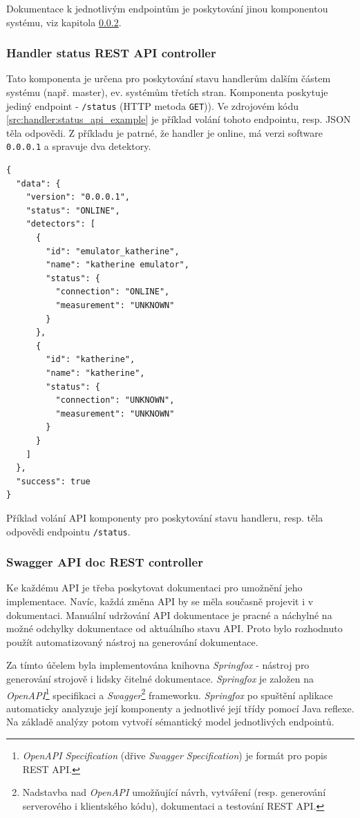 Dokumentace k jednotlivým endpointům je poskytování jinou komponentou systému, viz kapitola \ref{chap:handler:spring:swagger}.

\subsubsection{Handler status REST API controller}\label{chap:handler:spring:status_api}
Tato komponenta je určena pro poskytování stavu handlerům dalším částem systému (např. master), ev. systémům třetích stran. Komponenta poskytuje jediný endpoint - \texttt{/status} (HTTP metoda \texttt{GET})). Ve zdrojovém kódu \ref{src:handler:status_api_example} je příklad volání tohoto endpointu, resp. JSON těla odpovědi. Z příkladu je patrné, že handler je online, má verzi software \texttt{0.0.0.1} a spravuje dva detektory.

\begin{code}[h!]
  \begin{verbatim}
{
  "data": {
    "version": "0.0.0.1",
    "status": "ONLINE",
    "detectors": [
      {
        "id": "emulator_katherine",
        "name": "katherine emulator",
        "status": {
          "connection": "ONLINE",
          "measurement": "UNKNOWN"
        }
      },
      {
        "id": "katherine",
        "name": "katherine",
        "status": {
          "connection": "UNKNOWN",
          "measurement": "UNKNOWN"
        }
      }
    ]
  },
  "success": true
}
\end{verbatim}
\caption{Příklad volání API komponenty pro poskytování stavu handleru, resp. těla odpovědi endpointu \texttt{/status}.}
\label{src:handler:status_api_example}
\end{code}


\subsubsection{Swagger API doc REST controller}\label{chap:handler:spring:swagger}
Ke každému API je třeba poskytovat dokumentaci pro umožnění jeho implementace. Navíc, každá změna API by se měla současně projevit i v dokumentaci. Manuální udržování API dokumentace je pracné a náchylné na možné odchylky dokumentace od aktuálního stavu API. Proto bylo rozhodnuto použít automatizovaný nástroj na generování dokumentace.

Za tímto účelem byla implementována knihovna \textit{Springfox} \cite{springfox} - nástroj pro generování strojově i lidsky čitelné dokumentace. \textit{Springfox} je založen na \textit{OpenAPI}\footnote{\textit{OpenAPI Specification} (dřive \textit{Swagger Specification}) je formát pro popis REST API.} specifikaci a \textit{Swagger}\footnote{Nadstavba nad \textit{OpenAPI} umožňující návrh, vytváření (resp. generování serverového i klientského kódu), dokumentaci a testování REST API.} frameworku. \textit{Springfox} po spuštění aplikace automaticky analyzuje její komponenty a jednotlivé její třídy pomocí Java reflexe. Na základě analýzy potom vytvoří sémantický model jednotlivých endpointů.

